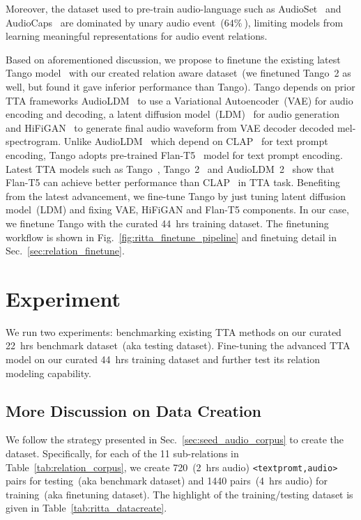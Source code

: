 Moreover, the dataset used to pre-train audio-language such as AudioSet~\citep{audioset_dataset} and AudioCaps~\citep{audiocaps} are dominated by unary audio event~($64\%~$\citep{ghosh2024compa}), limiting models from learning meaningful representations for audio event relations.

Based on aforementioned discussion, we propose to finetune the existing latest Tango model~\citep{ghosal2023tango} with our created relation aware dataset~(we finetuned Tango~2 as well, but found it gave inferior performance than Tango). Tango depends on prior TTA frameworks AudioLDM~\citep{liu2023audioldm} to use a Variational Autoencoder~(VAE) for audio encoding and decoding, a latent diffusion model~(LDM)~\citep{stable_diffusion} for audio generation and HiFiGAN~\citep{HiFiGAN} to generate final audio waveform from VAE decoder decoded mel-spectrogram. Unlike AudioLDM~\citep{liu2023audioldm} which depend on CLAP~\citep{laionclap2023} for text prompt encoding, Tango adopts pre-trained Flan-T5~\citep{FLAN-T5} model for text prompt encoding. Latest TTA models such as Tango~\citep{ghosal2023tango}, Tango~2~\citep{ghosal2023tango2} and AudioLDM~2~\citep{audioldm2} show that Flan-T5 can achieve better performance than CLAP~\citep{laionclap2023} in TTA task. Benefiting from the latest advancement, we fine-tune Tango by just tuning latent diffusion model~(LDM) and fixing VAE, HiFiGAN and Flan-T5 components. In our case, we finetune Tango with the curated 44~hrs training dataset. The finetuning workflow is shown in Fig.~\ref{fig:ritta_finetune_pipeline} and finetuing detail in Sec.~\ref{sec:relation_finetune}.

\section{Experiment}

We run two experiments: benchmarking existing TTA methods on our curated 22~hrs benchmark dataset~(aka testing dataset). Fine-tuning the advanced TTA model on our curated 44~hrs training dataset and further test its relation modeling capability.
\subsection{More Discussion on Data Creation}
\label{sec:data_prepare}

We follow the strategy presented in Sec.~\ref{sec:seed_audio_corpus} to create the dataset. Specifically, for each of the 11 sub-relations in Table~\ref{tab:relation_corpus}, we create 720~(2~hrs audio) \texttt{<textpromt,audio>} pairs for testing~(aka benchmark dataset) and 1440 pairs~(4~hrs audio) for training~(aka finetuning dataset). The highlight of the training/testing dataset is given in Table~\ref{tab:ritta_datacreate}.

